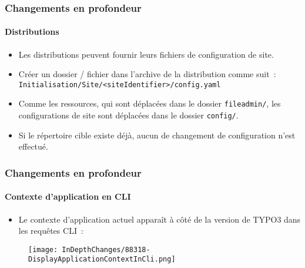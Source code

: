 
\begin{frame}[fragile]
	\frametitle{Changements en profondeur}
	\framesubtitle{Distributions}

	\lstset{basicstyle=\tiny\ttfamily}

	\begin{itemize}
		\item Les distributions peuvent fournir leurs fichiers de configuration de site.

		\item Créer un dossier / fichier dans l'archive de la distribution comme suit~:\newline
			\texttt{Initialisation/Site/<siteIdentifier>/config.yaml}

		\item Comme les ressources, qui sont déplacées dans le dossier \texttt{fileadmin/},\newline
			les configurations de site sont déplacées dans le dossier \texttt{config/}.

		\item Si le répertoire cible existe déjà, aucun de changement de configuration n'est effectué.
	\end{itemize}

\end{frame}


\begin{frame}[fragile]
	\frametitle{Changements en profondeur}
	\framesubtitle{Contexte d'application en CLI}

	\begin{itemize}
		\item Le contexte d'application actuel apparaît à côté de la version de
			TYPO3 dans les requêtes CLI~:
	\end{itemize}

	\begin{figure}
		\texttt{[image: InDepthChanges/88318-DisplayApplicationContextInCli.png]}
	\end{figure}

\end{frame}

